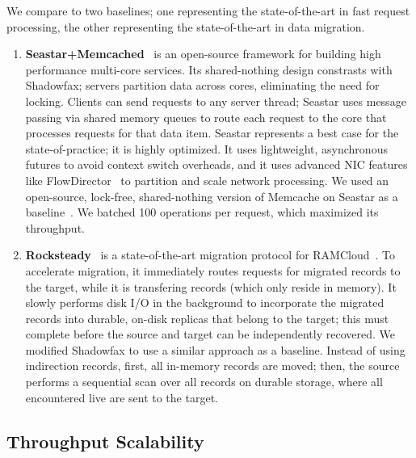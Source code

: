 We compare to two baselines; one representing the
state-of-the-art in fast request processing, the other representing the
state-of-the-art in data migration.

\begin{enumerate}
\item \textbf{Seastar+Memcached}~\cite{seastar}
is an open-source framework for building high
performance multi-core services.
%
Its shared-nothing design constrasts with Shadowfax;
servers partition data across cores, eliminating the need for locking.
%
Clients can send requests to any server thread;
Seastar uses message passing via shared memory queues to route
each request to the core that processes requests for that data item.
%
Seastar represents a best case for the state-of-practice; it is highly optimized.
%
It uses lightweight, asynchronous futures to avoid
context switch overheads, and it uses advanced NIC features like
FlowDirector~\cite{flow-director} to partition and scale network processing.
%
We used an open-source, lock-free, shared-nothing version of
Memcache on Seastar as a baseline~\cite{seastar-apps}.
%
We batched 100 operations per request, which maximized its throughput.

\item \textbf{Rocksteady}~\cite{rocksteady} is a state-of-the-art migration
protocol for RAMCloud~\cite{ramcloud}.
%
To accelerate migration, it immediately routes requests for migrated records
to the target, while it is transfering records (which only reside in memory).
%
It slowly performs disk I/O in the background to incorporate the migrated records
into durable, on-disk replicas that belong to the target; this must complete
before the source and target can be independently recovered.
%
%
We modified Shadowfax to use a similar approach as a baseline.
%
Instead of using indirection records, first, all in-memory records are moved;
then, the source performs a sequential scan over all records on durable
storage, where all encountered live are sent to the target.
%
%
\end{enumerate}

\subsection{Throughput Scalability}
\label{sec:eval:clients}

